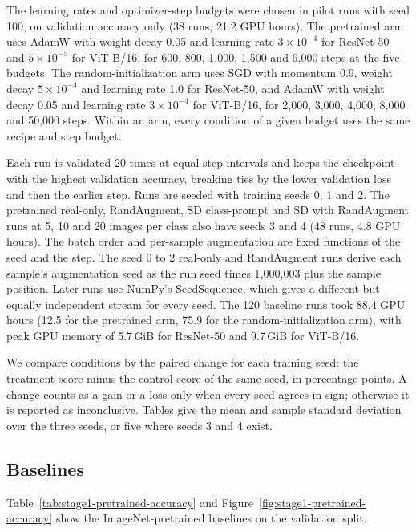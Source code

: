 \documentclass{scrartcl}
\begin{document}
The learning rates and optimizer-step budgets were chosen in pilot runs with seed 100, on validation accuracy only (38 runs, 21.2 GPU hours). The pretrained arm uses AdamW with weight decay 0.05 and learning rate $3\times10^{-4}$ for ResNet-50 and $5\times10^{-5}$ for ViT-B/16, for 600, 800, 1,000, 1,500 and 6,000 steps at the five budgets. The random-initialization arm uses SGD with momentum 0.9, weight decay $5\times10^{-4}$ and learning rate 1.0 for ResNet-50, and AdamW with weight decay 0.05 and learning rate $3\times10^{-4}$ for ViT-B/16, for 2,000, 3,000, 4,000, 8,000 and 50,000 steps. Within an arm, every condition of a given budget uses the same recipe and step budget.

Each run is validated 20 times at equal step intervals and keeps the checkpoint with the highest validation accuracy, breaking ties by the lower validation loss and then the earlier step. Runs are seeded with training seeds 0, 1 and 2. The pretrained real-only, RandAugment, SD class-prompt and SD with RandAugment runs at 5, 10 and 20 images per class also have seeds 3 and 4 (48 runs, 4.8 GPU hours). The batch order and per-sample augmentation are fixed functions of the seed and the step. The seed 0 to 2 real-only and RandAugment runs derive each sample's augmentation seed as the run seed times 1,000,003 plus the sample position. Later runs use NumPy's SeedSequence, which gives a different but equally independent stream for every seed. The 120 baseline runs took 88.4 GPU hours (12.5 for the pretrained arm, 75.9 for the random-initialization arm), with peak GPU memory of 5.7\,GiB for ResNet-50 and 9.7\,GiB for ViT-B/16.

We compare conditions by the paired change for each training seed: the treatment score minus the control score of the same seed, in percentage points. A change counts as a gain or a loss only when every seed agrees in sign; otherwise it is reported as inconclusive. Tables give the mean and sample standard deviation over the three seeds, or five where seeds 3 and 4 exist.

\subsection{Baselines}

Table~\ref{tab:stage1-pretrained-accuracy} and Figure~\ref{fig:stage1-pretrained-accuracy} show the ImageNet-pretrained baselines on the validation split.


\end{document}
